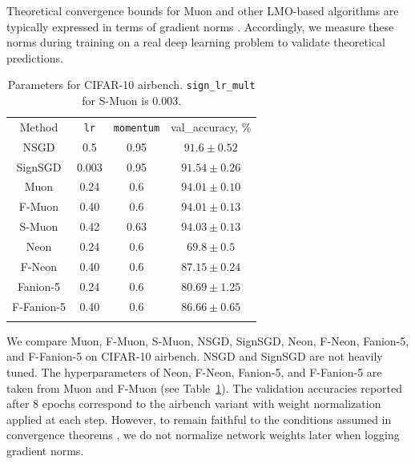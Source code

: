 \documentclass[a4paper,14pt,oneside]{extarticle}
\newcommand{\tableref}[1]{Table~\ref{#1}}
\begin{document}
Theoretical convergence bounds for Muon and other LMO-based algorithms are typically expressed in terms of gradient norms \citep{li2025noteconvergencemuon, kovalev2025understanding, pethick2025training, riabinin2025gluon,kovalev2025noneuclideansgdstructuredoptimization}. Accordingly, we measure these norms during training on a real deep learning problem to validate theoretical predictions.

\begin{table}[htbp]
  \centering
  \caption{Parameters for CIFAR-10 airbench. \texttt{sign\_lr\_mult} for S-Muon is 0.003.}
  \label{tbl:cifar_lrs}
  \begin{tabular}{cccc}
    \arrayrulecolor{black}\toprule
    Method & \texttt{lr}  & \texttt{momentum}  & val\_accuracy, \% \\
    \arrayrulecolor{black}\hline
    NSGD & 0.5 & 0.95 & $91.6 \pm 0.52$ \\
    \hdashline
    SignSGD & 0.003 & 0.95 & $91.54 \pm 0.26$ \\
    \hdashline
    Muon & 0.24 & 0.6 & $94.01 \pm 0.10$ \\
    F-Muon & 0.40 & 0.6 & $94.01 \pm 0.13$\\
    \hdashline
    S-Muon & 0.42 & 0.63 & $94.03 \pm 0.13$ \\
    \hdashline
    Neon & 0.24 & 0.6 & $69.8 \pm 0.5$ \\
    F-Neon & 0.40 & 0.6 & $87.15 \pm 0.24$\\
    \hdashline
    Fanion-5 & 0.24 & 0.6 & $80.69 \pm 1.25$ \\
    F-Fanion-5 & 0.40 & 0.6 & $86.66 \pm 0.65$\\
    \arrayrulecolor{black}\bottomrule
  \end{tabular}
\end{table}

We compare Muon, F-Muon, S-Muon, NSGD, SignSGD, Neon, F-Neon, Fanion-5, and F-Fanion-5 on CIFAR-10 airbench. NSGD and SignSGD are not heavily tuned. The hyperparameters of Neon, F-Neon, Fanion-5, and F-Fanion-5 are taken from Muon and F-Muon (see \tableref{tbl:cifar_lrs}). The validation accuracies reported after 8 epochs correspond to the airbench variant with weight normalization applied at each step. However, to remain faithful to the conditions assumed in convergence theorems \citep{kovalev2025understanding,riabinin2025gluon}, we do not normalize network weights later when logging gradient norms.
\end{document}
